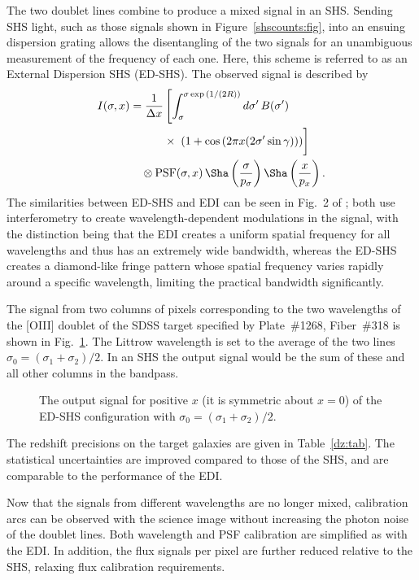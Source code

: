 \documentclass[preprint2, 10pt]{aastex}
\begin{document}
{The two doublet lines combine to produce a mixed signal in an SHS.  Sending SHS light, such as those signals shown
in  Figure~\ref{shscounts:fig}, into an ensuing dispersion grating
allows the disentangling of the two signals for an unambiguous measurement of the frequency of each one.  Here, 
this scheme is 
referred to as an External Dispersion SHS (ED-SHS).
The observed signal is described by
\begin{align}
I(\sigma,x) &= \frac{1}{\Delta x}\left[\int^{\sigma \exp{\left(1/(2R)\right)}}_{\sigma} d\sigma'\,B(\sigma') \right.\nonumber\\ 
& \quad\qquad \times \left.\vphantom{\int_{0}^{\infty}} \left(1+\cos{\left(2 \pi x (2\sigma' \sin{\gamma})\right)}\right) \right] \nonumber\\ 
& \quad \otimes \mbox{PSF}(\sigma,x)\, \Sha\left(\frac{\sigma}{p_\sigma}\right) \Sha\left(\frac{x}{p_x}\right).
\label{edishssig:eqn}
\end{align}
The similarities between ED-SHS and EDI can be seen in Fig.~2 of \citet{2003PASP..115..255E}; both use
interferometry to create wavelength-dependent modulations in the signal, with the distinction
being that the EDI creates a uniform spatial frequency for all wavelengths and thus has an extremely wide bandwidth, whereas the ED-SHS creates a diamond-like fringe pattern whose spatial frequency varies rapidly around a specific 
wavelength, limiting the practical bandwidth significantly.


The signal from two columns of pixels corresponding to the two wavelengths of
the [OIII] doublet of the
SDSS target specified by Plate~\#1268, Fiber~\#318 is shown in Fig.~\ref{edshs:fig}.
The Littrow wavelength is set to the average of the two lines  $\sigma_0=(\sigma_1+\sigma_2)/2$.
In an SHS the output signal would be the sum of these and all other columns in the bandpass.


\begin{figure}[t]
   \centering
   \caption{The output signal for positive $x$ (it is symmetric about
$x=0$) of the ED-SHS configuration with 
    $\sigma_0=(\sigma_1+\sigma_2)/2$. 
\label{edshs:fig}}
\end{figure} 


The redshift precisions on the target galaxies are given in Table~\ref{dz:tab}.  The statistical uncertainties are improved compared to those of the
SHS, and are comparable to the performance of the EDI.

Now that the signals from different wavelengths are no longer mixed, calibration arcs can be observed with the science image without increasing
the photon noise of the doublet lines.  Both wavelength and PSF calibration are simplified as with the EDI.
In addition, the flux signals per pixel are further reduced relative to the SHS, relaxing flux calibration requirements. 


}
\end{document}
